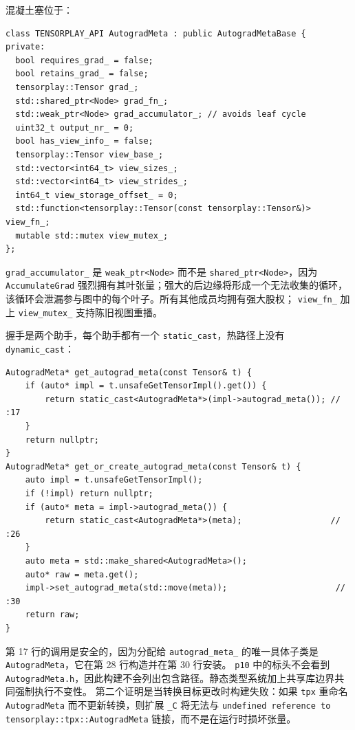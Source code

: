 混凝土塞位于：

\begin{lstlisting}[caption={concrete fields, tpx only.}, label=lst:autogradconcrete]
class TENSORPLAY_API AutogradMeta : public AutogradMetaBase {
private:
  bool requires_grad_ = false;
  bool retains_grad_ = false;
  tensorplay::Tensor grad_;
  std::shared_ptr<Node> grad_fn_;
  std::weak_ptr<Node> grad_accumulator_; // avoids leaf cycle
  uint32_t output_nr_ = 0;
  bool has_view_info_ = false;
  tensorplay::Tensor view_base_;
  std::vector<int64_t> view_sizes_;
  std::vector<int64_t> view_strides_;
  int64_t view_storage_offset_ = 0;
  std::function<tensorplay::Tensor(const tensorplay::Tensor&)> view_fn_;
  mutable std::mutex view_mutex_;
};
\end{lstlisting}

\texttt{grad\_accumulator\_} 是 \texttt{weak\_ptr<Node>} 而不是 \texttt{shared\_ptr<Node>}，因为 \texttt{AccumulateGrad} 强烈拥有其叶张量；强大的后边缘将形成一个无法收集的循环，该循环会泄漏参与图中的每个叶子。所有其他成员均拥有强大股权； \texttt{view\_fn\_} 加上 \texttt{view\_mutex\_} 支持陈旧视图重播。

握手是两个助手，每个助手都有一个 \texttt{static\_cast}，热路径上没有 \texttt{dynamic\_cast}：

\begin{lstlisting}[caption={the cast boundary.}, label=lst:handshake]
AutogradMeta* get_autograd_meta(const Tensor& t) {
    if (auto* impl = t.unsafeGetTensorImpl().get()) {
        return static_cast<AutogradMeta*>(impl->autograd_meta()); // :17
    }
    return nullptr;
}
AutogradMeta* get_or_create_autograd_meta(const Tensor& t) {
    auto impl = t.unsafeGetTensorImpl();
    if (!impl) return nullptr;
    if (auto* meta = impl->autograd_meta()) {
        return static_cast<AutogradMeta*>(meta);                  // :26
    }
    auto meta = std::make_shared<AutogradMeta>();
    auto* raw = meta.get();
    impl->set_autograd_meta(std::move(meta));                      // :30
    return raw;
}
\end{lstlisting}

第 17 行的调用是安全的，因为分配给 \texttt{autograd\_meta\_} 的唯一具体子类是 \texttt{AutogradMeta}，它在第 28 行构造并在第 30 行安装。 \texttt{p10} 中的标头不会看到 \texttt{AutogradMeta.h}，因此构建不会列出包含路径。静态类型系统加上共享库边界共同强制执行不变性。
第二个证明是当转换目标更改时构建失败：如果 \texttt{tpx} 重命名 \texttt{AutogradMeta} 而不更新转换，则扩展 \texttt{\_C} 将无法与 \texttt{undefined reference to tensorplay::tpx::AutogradMeta} 链接，而不是在运行时损坏张量。

